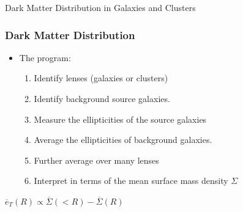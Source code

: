 \documentclass{beamer}
\begin{document}
\frame
{

    {\Huge Dark Matter Distribution in Galaxies and Clusters}

}



\frame
{
    \frametitle{Dark Matter Distribution}


    \begin{itemize}

        \item The program:
            \begin{enumerate}

                \item Identify lenses (galaxies or clusters)

                \item Identify background source galaxies.

                \item Measure the ellipticities of the source galaxies

                \item Average the ellipticities of background galaxies.

                \item Further average over many lenses

                \item Interpret in terms of the mean surface mass density {\color{gold}
                    $\Sigma$}

            \end{enumerate}
    \end{itemize}

    \begin{center}
        {\color{gold}
            {\huge
                $\overline{e}_{T}(R) \propto \overline{\Sigma}(<R) - \overline{\Sigma}(R)$
            }
        }
    \end{center}
}
\end{document}
